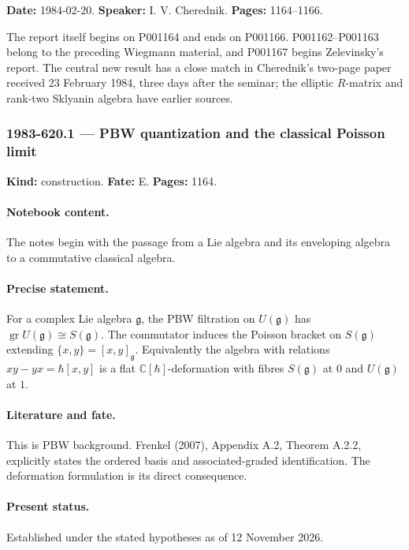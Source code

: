 \label{talk:620}

\noindent\textbf{Date:} 1984-02-20. \textbf{Speaker:} I. V. Cherednik. \textbf{Pages:} 1164--1166.\par

The report itself begins on P001164 and ends on P001166. P001162–P001163 belong to the preceding Wiegmann material, and P001167 begins Zelevinsky’s report. The central new result has a close match in Cherednik’s two-page paper received 23 February 1984, three days after the seminar; the elliptic \(R\)-matrix and rank-two Sklyanin algebra have earlier sources.

\subsubsection{1983-620.1 --- PBW quantization and the classical Poisson limit}

\label{item:1983-620.1}

\noindent\textbf{Kind:} construction. \textbf{Fate:} E. \textbf{Pages:} 1164.\par

\paragraph{Notebook content.} The notes begin with the passage from a Lie algebra and its enveloping algebra to a commutative classical algebra.

\paragraph{Precise statement.} For a complex Lie algebra \(\mathfrak g\), the PBW filtration on \(U(\mathfrak g)\) has \(\operatorname{gr}U(\mathfrak g)\cong S(\mathfrak g)\). The commutator induces the Poisson bracket on \(S(\mathfrak g)\) extending \(\{x,y\}=[x,y]_{\mathfrak g}\). Equivalently the algebra with relations \(xy-yx=\hbar[x,y]\) is a flat \(\mathbb C[\hbar]\)-deformation with fibres \(S(\mathfrak g)\) at \(0\) and \(U(\mathfrak g)\) at \(1\).

\paragraph{Literature and fate.} This is PBW background. Frenkel (2007), Appendix A.2, Theorem A.2.2, explicitly states the ordered basis and associated-graded identification. The deformation formulation is its direct consequence.

\paragraph{Present status.} Established under the stated hypotheses as of 12 November 2026.

